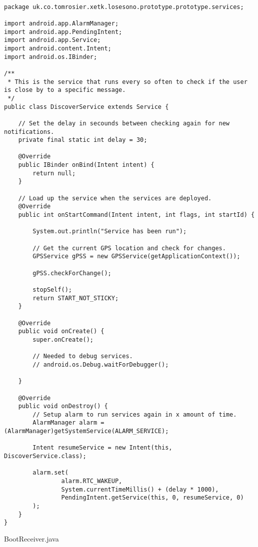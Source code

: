 \begin{lstlisting}

package uk.co.tomrosier.xetk.losesono.prototype.prototype.services;

import android.app.AlarmManager;
import android.app.PendingIntent;
import android.app.Service;
import android.content.Intent;
import android.os.IBinder;

/**
 * This is the service that runs every so often to check if the user is close by to a specific message.
 */
public class DiscoverService extends Service {

    // Set the delay in secounds between checking again for new notifications.
    private final static int delay = 30;

    @Override
    public IBinder onBind(Intent intent) {
        return null;
    }

    // Load up the service when the services are deployed.
    @Override
    public int onStartCommand(Intent intent, int flags, int startId) {

        System.out.println("Service has been run");

        // Get the current GPS location and check for changes.
        GPSService gPSS = new GPSService(getApplicationContext());

        gPSS.checkForChange();

        stopSelf();
        return START_NOT_STICKY;
    }

    @Override
    public void onCreate() {
        super.onCreate();

        // Needed to debug services.
        // android.os.Debug.waitForDebugger();

    }

    @Override
    public void onDestroy() {
        // Setup alarm to run services again in x amount of time.
        AlarmManager alarm = (AlarmManager)getSystemService(ALARM_SERVICE);

        Intent resumeService = new Intent(this, DiscoverService.class);

        alarm.set(
                alarm.RTC_WAKEUP,
                System.currentTimeMillis() + (delay * 1000),
                PendingIntent.getService(this, 0, resumeService, 0)
        );
    }
}

\end{lstlisting}

BootReceiver.java

